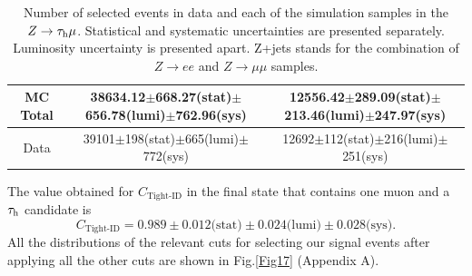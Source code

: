 \begin{table}[H]
{\begin{tabular}{ccc}
		\multicolumn{1}{c|}{MC Total}   & \multicolumn{1}{c|}{38634.12$\pm$668.27(stat)$\pm$656.78(lumi)$\pm$762.96(sys)}                         & 12556.42$\pm$289.09(stat)$\pm$213.46(lumi)$\pm$247.97(sys) \\ \hline
		\multicolumn{1}{c|}{Data}    & \multicolumn{1}{c|}{39101$\pm$198(stat)$\pm$665(lumi)$\pm$772(sys)}                               & 12692$\pm$112(stat)$\pm$216(lumi)$\pm$251(sys)      \\ \hline
	\end{tabular}
	}
	\caption{Number of selected events in data and each of the simulation samples in the $Z\to\tau_\text{h}\mu$. Statistical and systematic uncertainties are presented separately. Luminosity uncertainty is presented apart. Z+jets stands for the combination of $Z\to ee$ and $Z\to\mu\mu$ samples.}
	\label{Table6}
\end{table}
The value obtained for $C_{\text{Tight-ID}}$ in the final state that contains one muon and a $\tau_\text{h}$ candidate is
\begin{equation}
C_{\text{Tight-ID}}=0.989\pm 0.012\text{(stat)}\pm 0.024\text{(lumi)}\pm 0.028\text{(sys)}.
\end{equation}
All the distributions of the relevant cuts for selecting our signal events after applying all the other cuts are shown in Fig.\ref{Fig17} (Appendix A).
